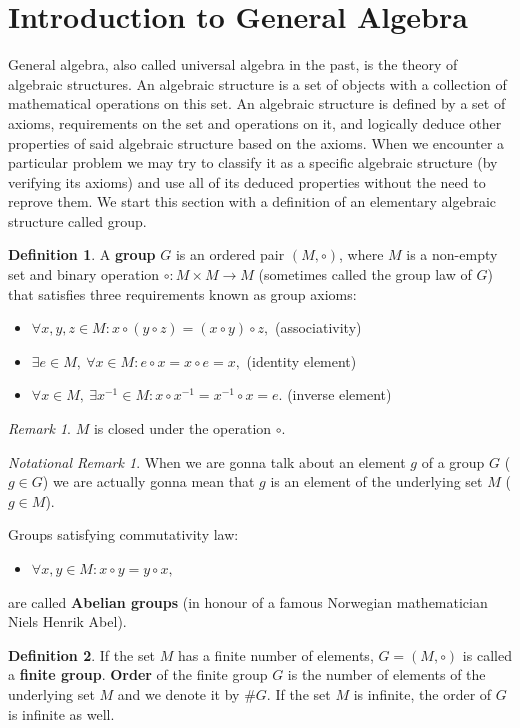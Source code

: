\documentclass[thesis=M,english]{FITthesis}[2012/10/20]
\theoremstyle{remark}
\newtheorem*{RM}{Remark}
\newtheorem*{NRM}{Notational Remark}
\theoremstyle{definition}
\newtheorem{DF}{Definition}[section]
\begin{document}
\section{Introduction to General Algebra}
General algebra, also called universal algebra in the past, is the theory of algebraic structures. An algebraic structure is a set of objects with a collection of mathematical operations on this set.  An algebraic structure is defined by a set of axioms, requirements on the set and operations on it, and logically deduce other properties of said algebraic structure based on the axioms. When we encounter a particular problem we may try to classify it as a specific algebraic structure (by verifying its axioms) and use all of its deduced properties without the need to reprove them. We start this section with a definition of an elementary algebraic structure called group.
\begin{DF}
A \textbf{group} $G$ is an ordered pair $(M,  \circ)$, where $M$ is a non-empty set and binary operation $\circ : M \times M \to M $ (sometimes called the group law of $G$) that satisfies three requirements known as group axioms: 
\end{DF}
\begin{itemize}
\item 
$ \forall x,y,z \in M: x\circ (y \circ z) = (x \circ y) \circ z,$ \hfill (associativity)
\item 
$ \exists e \in M,\ \forall x \in M: e \circ x = x \circ e = x,$ \hfill (identity element)
\item 
$\forall x \in M,\ \exists x^{-1} \in M: x \circ x^{-1} = x^{-1} \circ x = e.$ \hfill (inverse element)
\end{itemize}
\begin{RM}
$M$ is closed under the operation $\circ$. 
\end{RM}
\begin{NRM}
When we are gonna talk about an element  $g$ of a group $G$ ($g \in G$) we are actually gonna mean that $g$ is an element of the underlying set $M$ ($g \in M$).
\end{NRM}
Groups satisfying commutativity law:
\begin{itemize}
\item 
$ \forall x, y\in M: x \circ y = y \circ x,$
\end{itemize}
are called \textbf{Abelian groups} (in honour of a famous Norwegian mathematician Niels Henrik Abel). 
\begin{DF}
If the set $M$ has a finite number of elements, $G = (M, \circ)$ is called a \textbf{finite group}. \textbf{Order} of the finite group $G$ is the number of elements of the underlying set $M$ and we denote it by $\#G$. If the set $M$ is infinite, the order of $G$ is infinite as well.
\end{DF}
\end{document}
